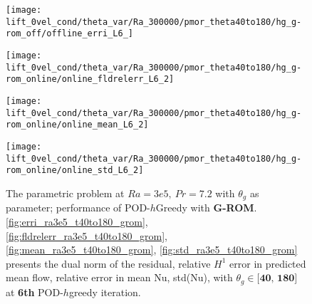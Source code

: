 \begin{figure}[h!]
    \begin{minipage}[b]{.25\linewidth}
        \centering \texttt{[image: lift\_0vel\_cond/theta\_var/Ra\_300000/pmor\_theta40to180/hg\_g-rom\_off/offline\_erri\_L6\_]}
        \label{fig:erri_ra3e5_t40to180_grom}
    \end{minipage}%
    \begin{minipage}[b]{.25\linewidth}
        \centering \texttt{[image: lift\_0vel\_cond/theta\_var/Ra\_300000/pmor\_theta40to180/hg\_g-rom\_online/online\_fldrelerr\_L6\_2]}
        \label{fig:fldrelerr_ra3e5_t40to180_grom}
    \end{minipage}
    \begin{minipage}[b]{.25\linewidth}
        \centering \texttt{[image: lift\_0vel\_cond/theta\_var/Ra\_300000/pmor\_theta40to180/hg\_g-rom\_online/online\_mean\_L6\_2]}
        \label{fig:mean_ra3e5_t40to180_grom}
    \end{minipage}%
    \begin{minipage}[b]{.25\linewidth}
        \centering \texttt{[image: lift\_0vel\_cond/theta\_var/Ra\_300000/pmor\_theta40to180/hg\_g-rom\_online/online\_std\_L6\_2]}
        \label{fig:std_ra3e5_t40to180_grom}
    \end{minipage} 
    \caption{The parametric problem at $Ra=3e5,~Pr=7.2$ with $\theta_g$ as
    parameter; performance of POD-$h$Greedy with \textbf{G-ROM}.  \ref{fig:erri_ra3e5_t40to180_grom},
    \ref{fig:fldrelerr_ra3e5_t40to180_grom}, \ref{fig:mean_ra3e5_t40to180_grom}, \ref{fig:std_ra3e5_t40to180_grom}
    presents the dual norm of the residual, relative $H^1$ error in predicted
    mean flow, relative error in mean Nu, std(Nu), with $\theta_g \in
    \textbf{[40,~180]}$ at \textbf{6th} POD-$h$greedy iteration.}
    \label{fig:online_ra3e5_t40to180_grom} 
\end{figure}

